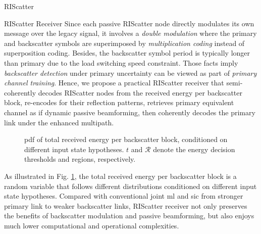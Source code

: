 \documentclass[journal]{IEEEtran}
\begin{document}
\begin{section}{RIScatter}
	\begin{subsection}{RIScatter Receiver}
		Since each passive RIScatter node directly modulates its own message over the legacy signal, it involves a \emph{double modulation} where the primary and backscatter symbols are superimposed by \emph{multiplication coding} instead of superposition coding.
		Besides, the backscatter symbol period is typically longer than primary due to the load switching speed constraint.
		Those facts imply \emph{backscatter detection} under primary uncertainty can be viewed as part of \emph{primary channel training}.
		Hence, we propose a practical RIScatter receiver that semi-coherently decodes RIScatter nodes from the received energy per backscatter block, re-encodes for their reflection patterns, retrieves primary equivalent channel as if dynamic passive beamforming, then coherently decodes the primary link under the enhanced multipath.
		\begin{figure}[!t]
			\centering
			\resizebox{0.9\columnwidth}{!}{
				
			}
			\caption{
				\gls{pdf} of total received energy per backscatter block, conditioned on different input state hypotheses.
				$t$ and $\mathcal{R}$ denote the energy decision thresholds and regions, respectively.
			}
			\label{fi:energy_distribution}
		\end{figure}
		As illustrated in Fig. \ref{fi:energy_distribution}, the total received energy per backscatter block is a random variable that follows different distributions conditioned on different input state hypotheses.
		Compared with conventional joint \gls{ml} and \gls{sic} from stronger primary link to weaker backscatter links, RIScatter receiver not only preserves the benefits of backscatter modulation and passive beamforming, but also enjoys much lower computational and operational complexities.
	\end{subsection}


\end{section}
\end{document}
